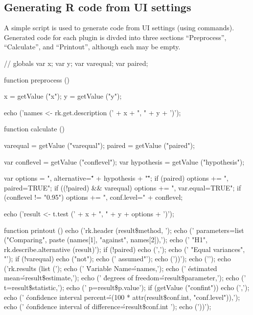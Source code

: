 \subsection{Generating R code from UI settings}
A simple  script is used to generate  code from UI settings (using  commands).
Generated code for each plugin is divded into three sections ``Preprocess'', ``Calculate'', and ``Printout'', although each
may be empty.
\begin{Code}
// globals
var x;
var y;
var varequal;
var paired;

function preprocess () {
  x = getValue ("x");
  y = getValue ("y");

  echo ('names <- rk.get.description (' + x + ", " + y + ')\n');
}

function calculate () {
  varequal = getValue ("varequal");
  paired = getValue ("paired");

  var conflevel = getValue ("conflevel");
  var hypothesis = getValue ("hypothesis");

  var options = ", alternative=\"" + hypothesis + "\"";
  if (paired) options += ", paired=TRUE";
  if ((!paired) && varequal) options += ", var.equal=TRUE";
  if (conflevel != "0.95") options += ", conf.level=" + conflevel;

  echo ('result <- t.test (' + x + ", " + y + options + ')\n');
}

function printout () {
  echo ('rk.header (result\$method, \n');
  echo ('  parameters=list ("Comparing", paste (names[1], "against", names[2]),\n');
  echo ('  "H1", rk.describe.alternative (result)');
  if (!paired) {
    echo (',\n');
    echo ('  "Equal variances", "');
    if (!varequal) echo ("not");
    echo (' assumed"');
  }
  echo ('))\n');
  echo ('\n');
  echo ('rk.results (list (\n');
  echo ('  \'Variable Name\'=names,\n');
  echo ('  \'estimated mean\'=result\$estimate,\n');
  echo ('  \'degrees of freedom\'=result\$parameter,\n');
  echo ('  t=result\$statistic,\n');
  echo ('  p=result\$p.value');
  if (getValue ("confint")) {
    echo (',\n');
    echo ('  \'confidence interval percent\'=(100 * attr(result\$conf.int, "conf.level")),\n');
    echo ('  \'confidence interval of difference\'=result\$conf.int ');
  }
  echo ('))\n');
}
\end{Code}
